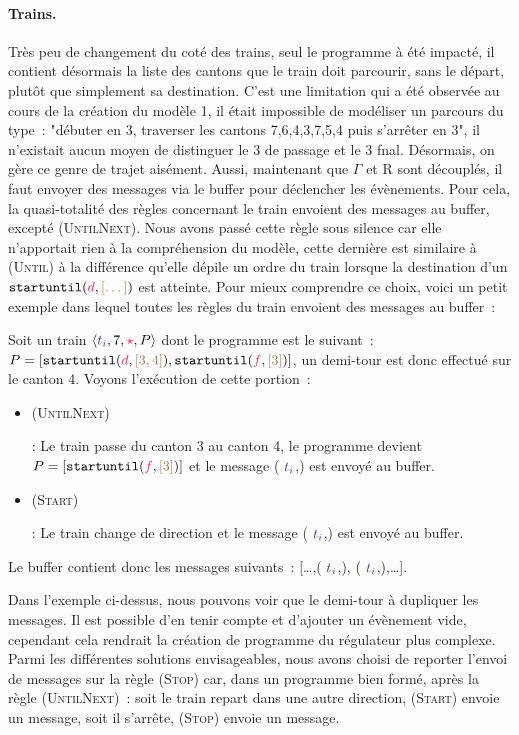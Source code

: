 \documentclass[oneside, a4paper, 11pt]{book}
\newcommand{\ruleFmt}[1]{\textsc{(#1)}}
\newcommand{\ruleDef}[1]{\hypertarget{#1}{\ruleFmt{#1}}}
\newcommand{\trainFmt}[1]{{\color{traincolor} #1}}
\newcommand{\tid}[1]{\ensuremath{\trainFmt{t_{#1}}}}
\newcommand{\dirFmt}[1]{{\color{dircolor} #1}}
\newcommand{\posFmt}[1]{{\color{poscolor}{#1}}}
\newcommand{\su}[2]{{\mbox{$\mathtt{startuntil}(\dirFmt{#1}, \posFmt{#2})$}}}
\newcommand\train[4]{ \langle #1, #2, #3, #4 \rangle}
\begin{document}
\paragraph{Trains.} Très peu de changement du coté des trains, seul le programme à été impacté, il contient désormais la liste des cantons que le train doit parcourir, sans le départ, plutôt que simplement sa destination.
C'est une limitation qui a été observée au cours de la création du modèle 1, il était impossible de modéliser un parcours du type~: "débuter en 3, traverser les cantons 7,6,4,3,7,5,4 puis s'arrêter en 3", il n'existait aucun moyen de distinguer le 3 de passage et le 3 fnal.
Désormais, on gère ce genre de trajet aisément. Aussi, maintenant que \trainFmt{$\Gamma$} et R sont découplés, il faut envoyer des messages via le buffer pour déclencher les évènements. Pour cela, la quasi-totalité des règles concernant le train envoient des messages au buffer, excepté \ruleDef{UntilNext}.
Nous avons passé cette règle sous silence car elle n'apportait rien à la compréhension du modèle, cette dernière est similaire à \ruleDef{Until} à la différence qu'elle dépile un ordre du train lorsque la destination d'un \su{d}{[\dots]} est atteinte. Pour mieux comprendre ce choix, voici un petit exemple dans lequel toutes les règles du train envoient des messages au buffer~:


\begin{example}
	Soit un train $\train{\tid{i}}{7}{\dirFmt{\star}}{P}$ dont le programme est le suivant~: $P = [\su{d}{[3,4]}, \su{f}{[3]}]$, un demi-tour est donc effectué sur le canton 4. 
	Voyons l'exécution de cette portion~:
	\begin{itemize}
		\item \ruleDef{UntilNext} : Le train passe du canton 3 au canton 4, le programme devient $P = [\su{f}{[3]}]$ et le message (\trainFmt{$\tid{i}$},\posFmt{4}) est envoyé au buffer.
		\item \ruleDef{Start} : Le train change de direction et le message (\trainFmt{$\tid{i}$},\posFmt{4}) est envoyé au buffer.
	\end{itemize}
	Le buffer contient donc les messages suivants~: [\dots,(\trainFmt{$\tid{i}$},\posFmt{4}), (\trainFmt{$\tid{i}$},\posFmt{4}),\dots].
\end{example}

\noindent
Dans l'exemple ci-dessus, nous pouvons voir que le demi-tour à dupliquer les messages. Il est possible d'en tenir compte et d'ajouter un évènement vide, cependant cela rendrait la création de programme du régulateur plus complexe.
Parmi les différentes solutions envisageables, nous avons choisi de reporter l'envoi de messages sur la règle \ruleDef{Stop} car, dans un programme bien formé, après la règle \ruleDef{UntilNext}~: soit le train repart dans une autre direction, \ruleDef{Start} envoie un message, soit il s'arrête, \ruleDef{Stop} envoie un message.
\end{document}
